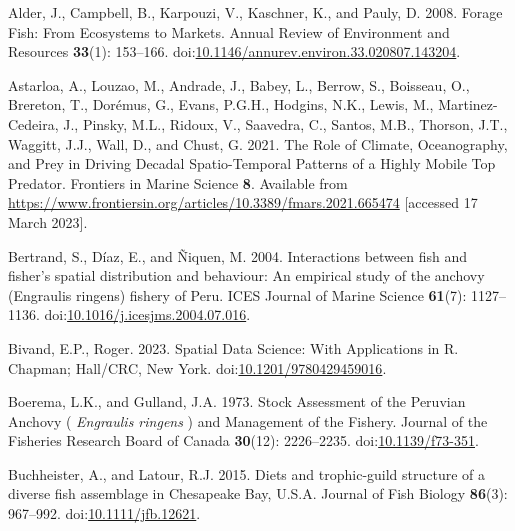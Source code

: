 \documentclass[
]{article}
\newlength{\cslhangindent}
\newlength{\cslentryspacingunit} %
\newenvironment{CSLReferences}[2] %
 {%
  \setlength{\parindent}{0pt}
  \ifodd #1
  \let\oldpar\par
  \def\par{\hangindent=\cslhangindent\oldpar}
  \fi
  \setlength{\parskip}{#2\cslentryspacingunit}
 }%
 {}
\begin{document}
\hypertarget{refs}{}
\begin{CSLReferences}{1}{0}
\leavevmode{}%
Alder, J., Campbell, B., Karpouzi, V., Kaschner, K., and Pauly, D. 2008. Forage {Fish}: {From} {Ecosystems} to {Markets}. Annual Review of Environment and Resources \textbf{33}(1): 153--166. doi:\href{https://doi.org/10.1146/annurev.environ.33.020807.143204}{10.1146/annurev.environ.33.020807.143204}.

\leavevmode{}%
Astarloa, A., Louzao, M., Andrade, J., Babey, L., Berrow, S., Boisseau, O., Brereton, T., Dorémus, G., Evans, P.G.H., Hodgins, N.K., Lewis, M., Martinez-Cedeira, J., Pinsky, M.L., Ridoux, V., Saavedra, C., Santos, M.B., Thorson, J.T., Waggitt, J.J., Wall, D., and Chust, G. 2021. The {Role} of {Climate}, {Oceanography}, and {Prey} in {Driving} {Decadal} {Spatio}-{Temporal} {Patterns} of a {Highly} {Mobile} {Top} {Predator}. Frontiers in Marine Science \textbf{8}. Available from \url{https://www.frontiersin.org/articles/10.3389/fmars.2021.665474} {[}accessed 17 March 2023{]}.

\leavevmode{}%
Bertrand, S., Díaz, E., and Ñiquen, M. 2004. Interactions between fish and fisher's spatial distribution and behaviour: An empirical study of the anchovy ({Engraulis} ringens) fishery of {Peru}. ICES Journal of Marine Science \textbf{61}(7): 1127--1136. doi:\href{https://doi.org/10.1016/j.icesjms.2004.07.016}{10.1016/j.icesjms.2004.07.016}.

\leavevmode{}%
Bivand, E.P., Roger. 2023. Spatial {Data} {Science}: {With} {Applications} in {R}. Chapman; Hall/CRC, New York. doi:\href{https://doi.org/10.1201/9780429459016}{10.1201/9780429459016}.

\leavevmode{}%
Boerema, L.K., and Gulland, J.A. 1973. Stock {Assessment} of the {Peruvian} {Anchovy} ( \emph{{Engraulis} ringens} ) and {Management} of the {Fishery}. Journal of the Fisheries Research Board of Canada \textbf{30}(12): 2226--2235. doi:\href{https://doi.org/10.1139/f73-351}{10.1139/f73-351}.

\leavevmode{}%
Buchheister, A., and Latour, R.J. 2015. Diets and trophic-guild structure of a diverse fish assemblage in {Chesapeake} {Bay}, {U}.{S}.{A}. Journal of Fish Biology \textbf{86}(3): 967--992. doi:\href{https://doi.org/10.1111/jfb.12621}{10.1111/jfb.12621}.


\end{CSLReferences}
\end{document}
